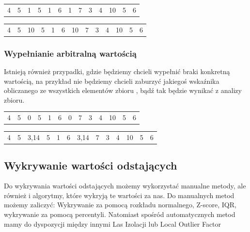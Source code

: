 \documentclass[oneside]{book}
\begin{document}
\begin{table}[H]
    \begin{tabular}{lllllllllllll}
    4 & 5 & {\color[HTML]{FE0000} 1} & 5 & 1 & 6 & {\color[HTML]{FE0000} 1} & 7 & 3 & 4 & 10 & 5 & 6
    \end{tabular}
    \end{table}


    \begin{table}[H]
        \begin{tabular}{lllllllllllll}
        4 & 5 & {\color[HTML]{FE0000} 10} & 5 & 1 & 6 & {\color[HTML]{FE0000} 10} & 7 & 3 & 4 & 10 & 5 & 6
        \end{tabular}
        \end{table}
\subsubsection*{Wypełnianie arbitralną wartością}
Istnieją również przypadki, gdzie będziemy 
chcieli wypełnić braki konkretną wartością, 
na przykład nie będziemy chcieli zaburzyć 
jakiegoś wskaźnika obliczanego ze wszystkich
elementów zbioru , bądź 
tak będzie wynikać z analizy zbioru.



\begin{table}[H]
    \begin{tabular}{lllllllllllll}
    4 & 5 & {\color[HTML]{FE0000} 0} & 5 & 1 & 6 & {\color[HTML]{FE0000} 0} & 7 & 3 & 4 & 10 & 5 & 6
    \end{tabular}
    \end{table}

    \begin{table}[H]
        \begin{tabular}{lllllllllllll}
        4 & 5 & {\color[HTML]{FE0000} 3,14} & 5 & 1 & 6 & {\color[HTML]{FE0000} 3,14} & 7 & 3 & 4 & 10 & 5 & 6
        \end{tabular}
        \end{table}

\subsection*{Wykrywanie wartości odstających}
Do wykrywania wartości odstających możemy wykorzystać manualne metody, 
ale również i algorytmy, które wykryją te wartości za nas. 
Do manualnych metod możemy zaliczyć: Wykrywanie za pomocą rozkładu 
normalnego, Z-score, IQR, wykrywanie za pomocą percentyli. 
Natomiast spośród automatycznych metod mamy do dyspozycji między innymi 
Las Izolacji lub Local Outlier Factor
\end{document}
